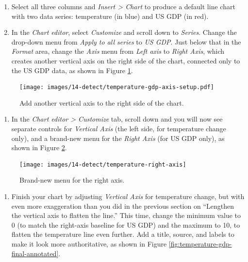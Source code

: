 \documentclass[
  english,
]{book}
\providecommand{\tightlist}{%
  \setlength{\itemsep}{0pt}\setlength{\parskip}{0pt}}
\begin{document}
\begin{enumerate}
\def\labelenumi{\arabic{enumi}.}
\item
  Select all three columns and \emph{Insert \textgreater{} Chart} to produce a default line chart with two data series: temperature (in blue) and US GDP (in red).
\item
  In the \emph{Chart editor}, select \emph{Customize} and scroll down to \emph{Series}. Change the drop-down menu from \emph{Apply to all series} to \emph{US GDP}. Just below that in the \emph{Format} area, change the \emph{Axis} menu from \emph{Left axis} to \emph{Right Axis}, which creates another vertical axis on the right side of the chart, connected only to the US GDP data, as shown in Figure \ref{fig:temperature-gdp-axis-setup}.
\end{enumerate}



\begin{figure}
\centering
\texttt{[image: images/14-detect/temperature-gdp-axis-setup.pdf]}
\caption{\label{fig:temperature-gdp-axis-setup}Add another vertical axis to the right side of the chart.}
\end{figure}

\begin{enumerate}
\def\labelenumi{\arabic{enumi}.}
\setcounter{enumi}{2}
\tightlist
\item
  In the \emph{Chart editor \textgreater{} Customize} tab, scroll down and you will now see separate controls for \emph{Vertical Axis} (the left side, for temperature change only), and a brand-new menu for the \emph{Right Axis} (for US GDP only), as shown in Figure \ref{fig:temperature-right-axis}.
\end{enumerate}



\begin{figure}
\texttt{[image: images/14-detect/temperature-right-axis]} \caption{Brand-new menu for the right axis.}\label{fig:temperature-right-axis}
\end{figure}

\begin{enumerate}
\def\labelenumi{\arabic{enumi}.}
\setcounter{enumi}{3}
\tightlist
\item
  Finish your chart by adjusting \emph{Vertical Axis} for temperature change, but with even more exaggeration than you did in the previous section on ``Lengthen the vertical axis to flatten the line.'' This time, change the minimum value to 0 (to match the right-axis baseline for US GDP) and the maximum to 10, to flatten the temperature line even further. Add a title, source, and labels to make it look more authoritative, as shown in Figure \ref{fig:temperature-gdp-final-annotated}.
\end{enumerate}
\end{document}

